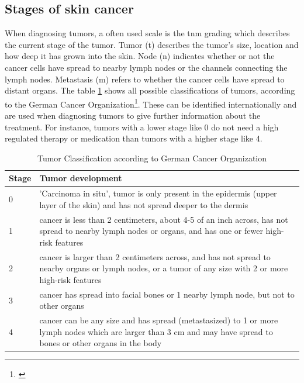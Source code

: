 \subsection{Stages of skin cancer}

When diagnosing tumors, a often used scale is the \ac{tnm} grading which describes the current stage of the tumor. 
Tumor (t) describes the tumor's size, location and how deep it has grown into the skin. Node (n) indicates whether or not the cancer cells have spread to nearby lymph nodes or the channels connecting the lymph nodes. Metastasis (m) refers to whether the cancer cells have spread to distant organs.
The table \ref{table_tnm} shows all possible classifications of tumors, according to the German Cancer Organization\footnote{\cite{dkgs_tumor_classification}}. These can be identified internationally and are used when diagnosing tumors to give further information about the treatment. For instance, tumors with a lower stage like 0 do not need a high regulated therapy or medication than tumors with a higher stage like 4.

\begin{table}[h!]
\begin{center}
\begin{tabularx}{\textwidth}{|XX|}
  \textbf{Stage} & \textbf{Tumor development} \\
\hline
0 & 'Carcinoma in situ', tumor is only present in the epidermis (upper layer of the skin) and has not spread deeper to the dermis \\
1 & cancer is less than 2 centimeters, about 4-5 of an inch across, has not spread to nearby lymph nodes or organs, and has one or fewer high-risk features  \\
2 & cancer is larger than 2 centimeters across, and has not spread to nearby organs or lymph nodes, or a tumor of any size with 2 or more high-risk features \\
3 & cancer has spread into facial bones or 1 nearby lymph node, but not to other organs  \\
4 & cancer can be any size and has spread (metastasized) to 1 or more lymph nodes which are larger than 3 cm and may have spread to bones or other organs in the body \\
\end{tabularx}
\caption{Tumor Classification according to German Cancer Organization} \label{table_tnm}         
\end{center}
\end{table}

